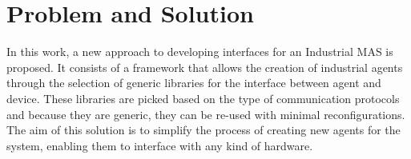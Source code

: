 \section{Problem and Solution}
\label{sec:problem_and_solution}

In this work, a new approach to developing interfaces for an Industrial \acrshort{MAS} is proposed. It consists of a framework that allows the creation of industrial agents through the selection of generic libraries for the interface between agent and device. These libraries are picked based on the type of communication protocols and because they are generic, they can be re-used with minimal reconfigurations. The aim of this solution is to simplify the process of creating new agents for the system, 
enabling them to interface with any kind of hardware.